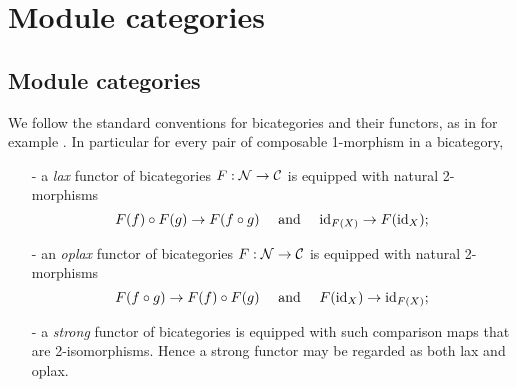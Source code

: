 \documentclass{amsart}
\begin{document}
\section{Module categories} \label{sec:tc-bimod}


\subsection{Module categories} %

We follow the standard conventions for bicategories and their functors, as in for example \cite{MR2664622}. In particular for every pair of composable 1-morphism in a bicategory, 
\begin{itemize}
	\item[-] a {\em lax} functor of bicategories $F: \mathcal N \to \mathcal C$ is equipped with natural 2-morphisms   
	\begin{equation*}
		F(f) \circ F(g) \to F(f \circ g) \quad \textrm{ and } \quad \mathrm{id}_{F(X)} \to F(\mathrm{id}_X);
	\end{equation*} 
	\item[-] an {\em oplax} functor of bicategories $F: \mathcal N \to \mathcal C$ is equipped with natural 2-morphisms
	\begin{equation*}
		F(f \circ g) \to F(f) \circ F(g)   \quad \textrm{ and } \quad F(\mathrm{id}_X) \to \mathrm{id}_{F(X)};
	\end{equation*}
	\item[-] a {\em strong} functor of bicategories is equipped with such comparison maps that are 2-isomorphisms. Hence a strong functor may be regarded as both lax and oplax. 
\end{itemize} 
\end{document}
